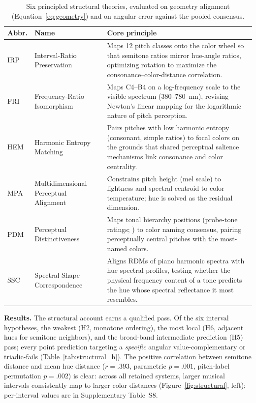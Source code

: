 \documentclass[12pt]{article}
\begin{document}
\begin{table}[htbp]
\centering
\caption{Six principled structural theories, evaluated on geometry
alignment (Equation~\ref{eq:geometry}) and on angular error against
the pooled consensus.}
\label{tab:structural_theories}
\begin{tabular}{@{}p{0.8cm}p{3.2cm}p{7.8cm}@{}}
\toprule
\textbf{Abbr.} & \textbf{Name} & \textbf{Core principle} \\
\midrule
IRP & Interval-Ratio Preservation    & Maps 12 pitch classes onto the color
  wheel so that semitone ratios mirror hue-angle ratios, optimizing rotation
  to maximize the consonance--color-distance correlation. \\[4pt]
FRI & Frequency-Ratio Isomorphism    & Maps C4--B4 on a log-frequency scale
  to the visible spectrum (380--780~nm), revising Newton's linear mapping for
  the logarithmic nature of pitch perception. \\[4pt]
HEM & Harmonic Entropy Matching      & Pairs pitches with low harmonic entropy
  (consonant, simple ratios) to focal colors \citep{berlin1969} on the
  grounds that shared perceptual salience mechanisms link consonance and
  color centrality. \\[4pt]
MPA & Multidimensional Perceptual Alignment & Constrains pitch height
  (mel scale) to lightness and spectral centroid to color temperature;
  hue is solved as the residual dimension. \\[4pt]
PDM & Perceptual Distinctiveness     & Maps tonal hierarchy positions
  (probe-tone ratings; \citealp{krumhansl1990}) to color naming
  consensus, pairing perceptually central pitches with the most-named
  colors. \\[4pt]
SSC & Spectral Shape Correspondence  & Aligns RDMs of piano harmonic spectra
  with hue spectral profiles, testing whether the physical frequency content
  of a tone predicts the hue whose spectral reflectance it most resembles. \\
\bottomrule
\end{tabular}
\end{table}

\textbf{Results.} The structural account earns a qualified pass. Of
the six interval hypotheses, the weakest (H2, monotone ordering), the
most local (H6, adjacent hues for semitone neighbors), and the
broad-band intermediate prediction (H5) pass; every point prediction
targeting a \emph{specific} angular value-complementary or
triadic-fails (Table~\ref{tab:structural_h}). The positive
correlation between
semitone distance and mean hue distance ($r = .393$, parametric
$p = .001$, pitch-label permutation $p = .002$) is
clear: across all retained systems, larger musical intervals
consistently map to larger color distances
(Figure~\ref{fig:structural}, left); per-interval values are in
Supplementary Table~S8.
\end{document}
